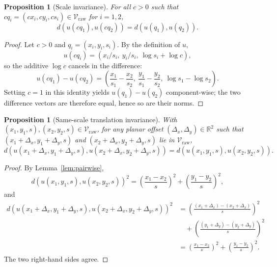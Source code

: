 \documentclass{article}
\newtheorem{proposition}[lemma]{Proposition}
\begin{document}
\begin{proposition}[Scale invariance]\label{prop:scale-invariance}
For all $c > 0$ such that $c q_i = (c x_i, c y_i, c s_i) \in \mathcal{V}_{\mathrm{raw}}$ for $i=1,2$,
\[
d(u(c q_1), u(c q_2)) = d(u(q_1), u(q_2)).
\]
\end{proposition}
\begin{proof}
Let $c > 0$ and $q_i = (x_i,y_i,s_i)$. By the definition of $u$,
\[
u(c q_i) = ( x_i/s_i,\ y_i/s_i,\ \log s_i + \log c ),
\]
so the additive $\log c$ cancels in the difference:
\[
u(c q_1) - u(c q_2) = \left( \frac{x_1}{s_1} - \frac{x_2}{s_2},\ \frac{y_1}{s_1} - \frac{y_2}{s_2},\ \log s_1 - \log s_2 \right).
\]
Setting $c = 1$ in this identity yields $u(q_1) - u(q_2)$ component-wise; the two difference vectors are therefore equal, hence so are their norms.
\end{proof}

\begin{proposition}[Same-scale translation invariance]\label{prop:translation-invariance}
With $(x_1, y_1, s), (x_2, y_2, s) \in \mathcal{V}_{\mathrm{raw}}$, for any planar offset $(\Delta_x,\Delta_y) \in \mathbb{R}^2$ such that $(x_1+\Delta_x,y_1+\Delta_y,s)$ and $(x_2+\Delta_x,y_2+\Delta_y,s)$ lie in $\mathcal{V}_{\mathrm{raw}}$,
\[
d(u(x_1+\Delta_x, y_1+\Delta_y, s), u(x_2+\Delta_x, y_2+\Delta_y, s)) = d(u(x_1, y_1, s), u(x_2, y_2, s)).
\]
\end{proposition}
\begin{proof}
By Lemma~\ref{lem:pairwise},
\[
d(u(x_1, y_1, s), u(x_2, y_2, s))^2 = \left( \frac{x_1 - x_2}{s} \right)^2 + \left( \frac{y_1 - y_2}{s} \right)^2,
\]
and
\begin{align*}
d(u(x_1+\Delta_x, y_1+\Delta_y, s), u(x_2+\Delta_x, y_2+\Delta_y, s))^2
&= \left( \frac{(x_1+\Delta_x) - (x_2+\Delta_x)}{s} \right)^2 \\
&\quad + \left( \frac{(y_1+\Delta_y) - (y_2+\Delta_y)}{s} \right)^2 \\
&= \left( \frac{x_1 - x_2}{s} \right)^2 + \left( \frac{y_1 - y_2}{s} \right)^2.
\end{align*}
The two right-hand sides agree.
\end{proof}
\end{document}

